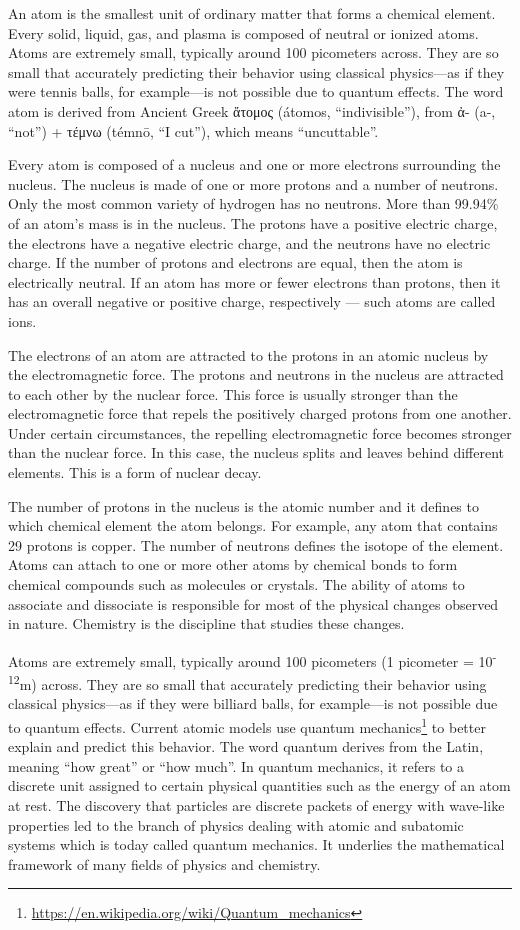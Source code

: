 \documentclass[
]{book}
\renewcommand{\href}[2]{#2\footnote{\url{#1}}}
\begin{document}
An atom is the smallest unit of ordinary matter that forms a chemical element. Every solid, liquid, gas, and plasma is composed of neutral or ionized atoms. Atoms are extremely small, typically around 100 picometers across. They are so small that accurately predicting their behavior using classical physics---as if they were tennis balls, for example---is not possible due to quantum effects. The word atom is derived from Ancient Greek ἄτομος (átomos, ``indivisible''), from ἀ- (a-, ``not'') + τέμνω (témnō, ``I cut''), which means ``uncuttable''.

Every atom is composed of a nucleus and one or more electrons surrounding the nucleus. The nucleus is made of one or more protons and a number of neutrons. Only the most common variety of hydrogen has no neutrons. More than 99.94\% of an atom's mass is in the nucleus. The protons have a positive electric charge, the electrons have a negative electric charge, and the neutrons have no electric charge. If the number of protons and electrons are equal, then the atom is electrically neutral. If an atom has more or fewer electrons than protons, then it has an overall negative or positive charge, respectively --- such atoms are called ions.

The electrons of an atom are attracted to the protons in an atomic nucleus by the electromagnetic force. The protons and neutrons in the nucleus are attracted to each other by the nuclear force. This force is usually stronger than the electromagnetic force that repels the positively charged protons from one another. Under certain circumstances, the repelling electromagnetic force becomes stronger than the nuclear force. In this case, the nucleus splits and leaves behind different elements. This is a form of nuclear decay.

The number of protons in the nucleus is the atomic number and it defines to which chemical element the atom belongs. For example, any atom that contains 29 protons is copper. The number of neutrons defines the isotope of the element. Atoms can attach to one or more other atoms by chemical bonds to form chemical compounds such as molecules or crystals. The ability of atoms to associate and dissociate is responsible for most of the physical changes observed in nature. Chemistry is the discipline that studies these changes.

Atoms are extremely small, typically around 100 picometers (1 picometer = 10\textsuperscript{-12}m) across. They are so small that accurately predicting their behavior using classical physics---as if they were billiard balls, for example---is not possible due to quantum effects. Current atomic models use \href{https://en.wikipedia.org/wiki/Quantum_mechanics}{quantum mechanics} to better explain and predict this behavior. The word quantum derives from the Latin, meaning ``how great'' or ``how much''. In quantum mechanics, it refers to a discrete unit assigned to certain physical quantities such as the energy of an atom at rest. The discovery that particles are discrete packets of energy with wave-like properties led to the branch of physics dealing with atomic and subatomic systems which is today called quantum mechanics. It underlies the mathematical framework of many fields of physics and chemistry.
\end{document}
